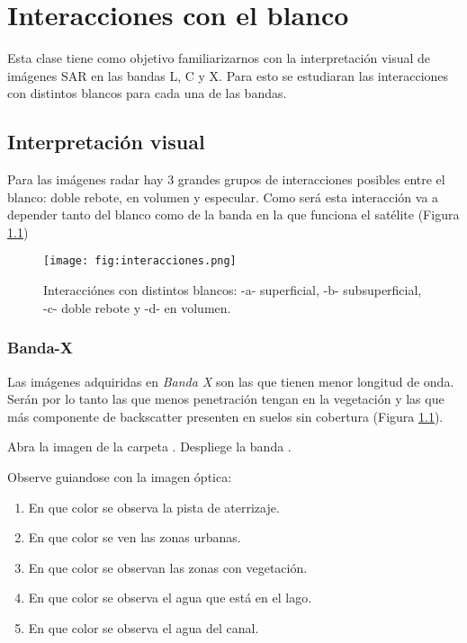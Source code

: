 \chapter{Interacciones con el blanco}

Esta clase tiene como objetivo familiarizarnos con la interpretación visual de imágenes SAR en las bandas L, C y X. Para esto se estudiaran las interacciones con distintos blancos para cada una de las bandas.

\section{Interpretación visual}

Para las imágenes radar hay 3 grandes grupos de interacciones posibles entre el blanco: doble rebote, en volumen y especular. Como será esta interacción va a depender tanto del blanco como de la banda en la que funciona el satélite (Figura \ref{fig:interacciones})

\begin{figure}[h!]
    \centering
    \texttt{[image: fig:interacciones.png]}
    \caption{Interacciónes con distintos blancos: -a- superficial, -b- subsuperficial, -c- doble rebote y -d- en volumen.}
    \label{fig:interacciones}
\end{figure}

\subsection{Banda-X}

Las imágenes adquiridas en \emph{Banda X} son las que tienen menor longitud de onda. Serán por lo tanto las que menos penetración tengan en la vegetación y las que más componente de backscatter presenten en suelos sin cobertura (Figura \ref{fig:interacciones}).


Abra la imagen  de la carpeta . Despliege la banda .

Observe guiandose con la imagen óptica:

\begin{enumerate}
    \item En que color se observa la pista de aterrizaje.
    \item En que color se ven las zonas urbanas.
    \item En que color se observan las zonas con vegetación.
    \item En que color se observa el agua que está en el lago.
    \item En que color se observa el agua del canal.
\end{enumerate}


